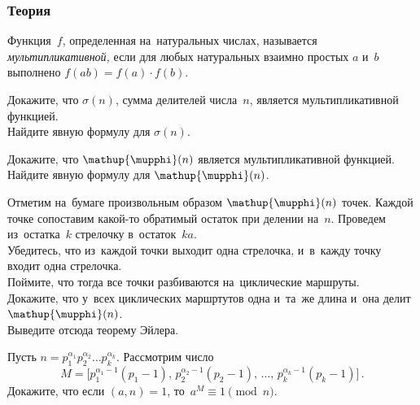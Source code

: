 


\begingroup
    \ifdefined\mathup
        \providecommand\eulerphi{\mathup{\mupphi}}\fi
    \ifdefined\upphi
        \providecommand\eulerphi{\upphi}\fi
    \providecommand\eulerphi{\phi}%

\subsubsection*{Теория}

Функция~$f$, определенная на~натуральных числах, называется
\emph{мультипликативной,} если для любых натуральных взаимно простых $a$ и~$b$
выполнено $f(a b) = f(a) \cdot f(b)$.

\begin{problems}

\item
\subproblem
Докажите, что $\sigma(n)$, сумма делителей числа~$n$, является
мультипликативной функцией.
\\
\subproblem
Найдите явную формулу для $\sigma(n)$.

\item
\subproblem
Докажите, что $\eulerphi(n)$ является мультипликативной функцией.
\\
\subproblem
Найдите явную формулу для $\eulerphi(n)$.

\item
Отметим на~бумаге произвольным образом $\eulerphi(n)$ точек.
Каждой точке сопоставим какой-то обратимый остаток при делении на~$n$.
Проведем из~остатка~$k$ стрелочку в~остаток~$ka$.
\\
\subproblem
Убедитесь, что из~каждой точки выходит одна стрелочка, и~в~кажду точку входит
одна стрелочка.
\\
\subproblem
Поймите, что тогда все точки разбиваются на~циклические маршруты.
\\
\subproblem
Докажите, что у~всех циклических маршртутов одна и~та~же длина и~она делит
$\eulerphi(n)$.
\\
\subproblem
Выведите отсюда теорему Эйлера.

\item
Пусть
\( n = p_{1}^{\alpha_{1}} p_{2}^{\alpha_{2}} \ldots p_{k}^{\alpha_{k}} \).
Рассмотрим число
\[
    M
=
    \bigl[
        p_{1}^{\alpha_{1} - 1} (p_{1} - 1)
    , \,
        p_{2}^{\alpha_{2} - 1} (p_{2} - 1)
    , \, \ldots , \,
        p_{k}^{\alpha_{k} - 1} (p_{k} - 1)
    \bigr]
\, . \]
Докажите, что если $(a, n) = 1$, то~$a^{M} \equiv 1 \pmod{n}$.

\end{problems}


